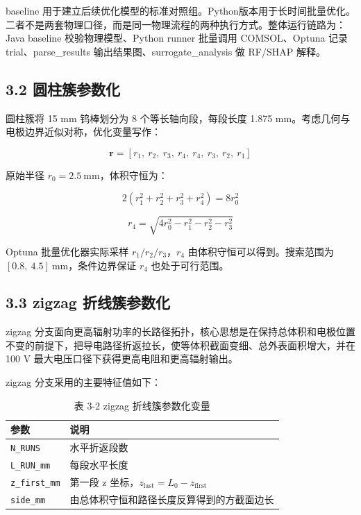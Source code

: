 \documentclass[
  a4paper,
]{ctexart}
\begin{document}
baseline
用于建立后续优化模型的标准对照组。Python版本用于长时间批量优化。二者不是两套物理口径，而是同一物理流程的两种执行方式。整体运行链路为：Java
baseline 校验物理模型、Python runner 批量调用 COMSOL、Optuna 记录
trial、parse\_results 输出结果图、surrogate\_analysis 做 RF/SHAP 解释。

\subsection{3.2
圆柱簇参数化}\label{ux5706ux67f1ux7c07ux53c2ux6570ux5316}

圆柱簇将 15 mm 钨棒划分为 8 个等长轴向段，每段长度 1.875
mm。考虑几何与电极边界近似对称，优化变量写作：

\[
\mathbf r=[r_1,\ r_2,\ r_3,\ r_4,\ r_4,\ r_3,\ r_2,\ r_1]
\]

原始半径 \(r_0=2.5\ \mathrm{mm}\)，体积守恒为：

\[
2\left(r_1^2+r_2^2+r_3^2+r_4^2\right)=8r_0^2
\]

\[
r_4=\sqrt{4r_0^2-r_1^2-r_2^2-r_3^2}
\]

Optuna 批量优化器实际采样 \(r_1/r_2/r_3\)，\(r_4\)
由体积守恒可以得到。搜索范围为
\([0.8,\ 4.5]\ \mathrm{mm}\)，条件边界保证 \(r_4\) 也处于可行范围。

\subsection{3.3 zigzag
折线簇参数化}\label{zigzag-ux6298ux7ebfux7c07ux53c2ux6570ux5316}

zigzag
分支面向更高辐射功率的长路径拓扑，核心思想是在保持总体积和电极位置不变的前提下，把导电路径折返拉长，使等体积截面变细、总外表面积增大，并在
100 V 最大电压口径下获得更高电阻和更高辐射输出。

zigzag 分支采用的主要特征值如下：


\begin{table}[H]
\centering
\caption*{表 3-2 zigzag 折线簇参数化变量}
\small
\begin{tabularx}{0.82\textwidth}{>{\centering\arraybackslash}p{} >{\centering\arraybackslash}X}
\toprule
参数 & 说明 \\
\midrule
\texttt{N\_RUNS} & 水平折返段数 \\
\texttt{L\_RUN\_mm} & 每段水平长度 \\
\texttt{z\_first\_mm} & 第一段 z 坐标，\(z_\mathrm{last}=L_0-z_\mathrm{first}\) \\
\texttt{side\_mm} & 由总体积守恒和路径长度反算得到的方截面边长 \\
\bottomrule
\end{tabularx}
\end{table}
\end{document}

